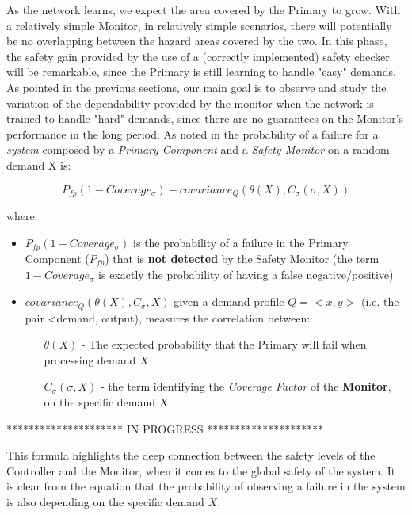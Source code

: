 As the network learns, we expect the area covered by the Primary to grow. With a relatively simple Monitor, in relatively simple scenarios, there will potentially be no overlapping between the hazard areas covered by the two. In this phase, the safety gain provided by the use of a (correctly implemented) safety checker will be remarkable, since the Primary is still learning to handle "easy" demands. As pointed in the previous sections, our main goal is to observe and study the variation of the dependability provided by the monitor when the network is trained to handle "hard" demands, since there are no guarantees on the Monitor's performance in the long period.\newline
As noted in \cite{striginiPopov} the probability of a failure for a \textsl{system} composed by a \textsl{Primary Component} and a \textsl{Safety-Monitor} on a random demand X is:

\begin{equation}
	P_{fp} (1 - Coverage_{\sigma}) - covariance_{Q} (\theta (X), C_{\sigma} (\sigma , X))
\end{equation}

where:

\begin{itemize}
	\item $P_{fp} (1 - Coverage_{\sigma})$ is the probability of a failure in the Primary Component ($P_{fp}$) that is \textbf{not detected} by the Safety Monitor (the term $1 - Coverage_{\sigma}$ is exactly the probability of having a false negative/positive)
	\item $covariance_{Q} (\theta (X), C_{\sigma}, X)$ given a demand profile $Q = <x, y>$ (i.e. the pair <demand, output), measures the correlation between:
	\begin{itemize}
		\item[$\theta (X)$ -] The expected probability that the Primary will fail when processing demand $X$
		\item[$C_{\sigma} (\sigma, X)$ -] the term identifying the \textsl{Coverage Factor} of the \textbf{Monitor}, on the specific demand $X$
	\end{itemize}
\end{itemize}

*********************\newline
IN PROGRESS\newline
*********************\newline

This formula highlights the deep connection between the safety levels of the Controller and the Monitor, when it comes to the global safety of the system. It is clear from the equation that the probability of observing a failure in the system is also depending on the specific demand $X$.\newline 

